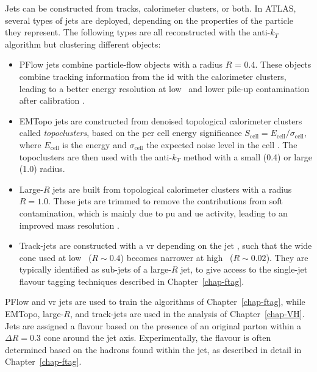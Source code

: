 Jets can be constructed from tracks, calorimeter clusters, or both. In ATLAS, several types of jets are deployed, depending on the properties of the particle they represent. The following types are all reconstructed with the anti-$k_T$ algorithm but clustering different objects:
\begin{itemize}[leftmargin=*]
\item PFlow jets combine particle-flow objects \cite{atlasPFLOWjet} with a radius $R$ = 0.4. These objects combine tracking information from the \gls{id} with the calorimeter clusters, leading to a better energy resolution at low \pt\ and lower pile-up contamination after calibration \cite{PhysRevD.96.072002}.
\item EMTopo jets are constructed from denoised topological calorimeter clusters called \textit{topoclusters}, based on the per cell energy significance $S_{\text{cell}} = E_{\text{cell}} / \sigma_{\text{cell}}$, where $E_{\text{cell}}$ is the energy and $\sigma_{\text{cell}}$ the expected noise level in the cell \cite{atlasEMTOpo}. The topoclusters are then used with the anti-$k_T$ method with a small (0.4) or large (1.0) radius.
\item Large-$R$ jets are built from topological calorimeter clusters with a radius $R = 1.0$. These jets are trimmed to remove the contributions from soft contamination, which is mainly due to \gls{pu} and \gls{ue} activity, leading to an improved mass resolution \cite{ATLAS:largeRjet}.
\item Track-jets are constructed with a \gls{vr} depending on the jet \pt, such that the wide cone used at low \pt\ ($R \sim 0.4$) becomes narrower at high \pt\ ($R \sim 0.02$). They are typically identified as sub-jets of a large-$R$ jet, to give access to the single-jet flavour tagging techniques described in Chapter~\ref{chap-ftag}.
\end{itemize}
PFlow and \gls{vr} jets are used to train the algorithms of Chapter~\ref{chap-ftag}, while EMTopo, large-$R$, and track-jets are used in the analysis of Chapter~\ref{chap-VH}. Jets are assigned a flavour based on the presence of an original parton within a $\Delta R = 0.3$ cone around the jet axis. Experimentally, the flavour is often determined based on the hadrons found within the jet, as described in detail in Chapter~\ref{chap-ftag}. \\

